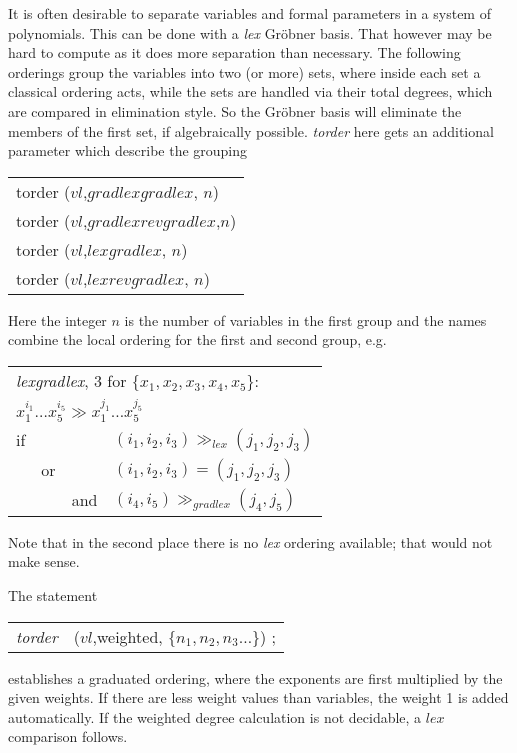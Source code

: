 It is often desirable to separate variables
and formal parameters in a system of polynomials.
This can be done with a {\it lex} Gr\"obner
basis.  That however may be hard to compute as it does more
separation than necessary. The following orderings group the
variables into two (or more) sets, where inside each set a classical
ordering acts, while the sets are handled via their total degrees,
which are compared in elimination style. So the Gr\"obner basis will
eliminate the members of the first set, if algebraically possible.
{\it torder} here gets an additional parameter which describe the
grouping 
\begin{center}{\it
\begin{tabular}{l}
torder ($vl$,$gradlexgradlex$, $n$) \\
torder ($vl$,$gradlexrevgradlex$,$n$) \\
torder ($vl$,$lexgradlex$, $n$) \\
torder ($vl$,$lexrevgradlex$, $n$)
\end{tabular}}
\end{center}
Here the integer $n$ is the number of variables in the first group
and the names combine the local ordering for the first and second
group, e.g.
\begin{center}
\begin{tabular}{llll}
\multicolumn{4}{l}{{\it lexgradlex}, 3 for $\{x_1,x_2,x_3,x_4,x_5\}$:} \\
\multicolumn{4}{l}{$x_1^{i_1}\ldots x_5^{i_5} \gg x_1^{j_1}\ldots
x_5^{j_5}$} \\
if & & & $(i_1,i_2,i_3) \gg_{lex}(j_1,j_2,j_3)$ \\
& or & & $(i_1,i_2,i_3) = (j_1,j_2,j_3)$ \\
& & and & $(i_4,i_5) \gg_{gradlex}(j_4,j_5)$
\end{tabular}
\end{center}
Note that in the second place there is no {\it lex} ordering available;
that would not make sense.

 
The statement
\begin{center}
\begin{tabular}{cl}
{\it torder} &($vl$,weighted, $\{n_1,n_2,n_3  \ldots$\}) ; \\
\end{tabular}
\end{center}
establishes a graduated ordering, where the exponents are first
multiplied by the given weights. If there are less weight values than
variables, the weight 1 is added automatically. If the weighted
degree calculation is not decidable, a $lex$ comparison follows.

